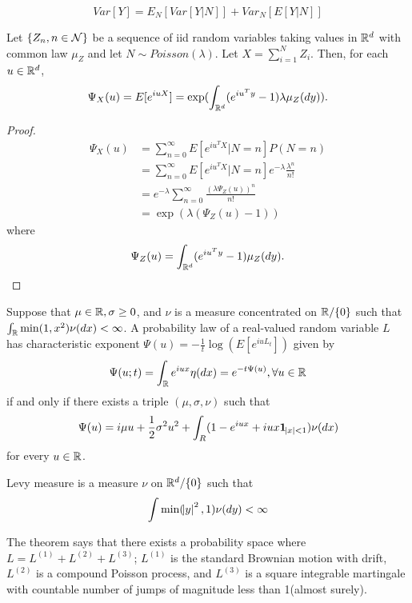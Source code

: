 \begin{refsection}
\begin{lemma}
	$$Var[Y] = E_N[Var[Y|N]] + Var_N[E[Y|N]]$$
\end{lemma}


\begin{lemma}
	Let $\{Z_n,n\in \mathcal{N} \}$ be a sequence of iid random variables taking values in $\mathbb{R}^d$ with common law $\mu_Z$ and let $N\sim Poisson(\lambda)$. Let 
	$X = \sum_{i=1}^N Z_i.$ 
	Then, for each $u\in \mathbb{R}^d$, 
	$$\Psi_X(u) = E[e^{iuX}] = \exp(\int_{\mathbb{R}^d} (e^{iu^Ty}-1)\lambda \mu_Z(dy)).$$
\end{lemma}
\begin{proof}
	\begin{align*}
	\Psi_X(u) &= \sum_{n=0}^\infty E[e^{iu^TX}|N=n]P(N=n)\\
	&=\sum_{n=0}^\infty E[e^{iu^TX}|N=n]e^{-\lambda} \frac{\lambda^n}{n!}\\
	&=e^{-\lambda}\sum_{n=0}^\infty \frac{(\lambda\Psi_Z(u))^n}{n!}\\
	&=\exp(\lambda(\Psi_Z(u)-1))
	\end{align*}
	where
	$$\Psi_Z(u) = \int_{\mathbb{R}^d} (e^{iu^Ty}-1) \mu_Z(dy).$$
\end{proof}



\begin{theorem}
	Suppose that $\mu\in \mathbb{R}, \sigma \geq 0$, and $\nu$ is a measure concentrated on $\mathbb{R}/\{0\}$ such that $\int_{\mathbb{R}}\min(1,x^2)\nu(dx) < \infty$. A probability law of a real-valued random variable $L$ has characteristic exponent $\Psi(u) = -\frac{1}{t}\log(E[e^{iuL_t}])$ given by
	$$\Psi(u;t) = \int_{\mathbb{R}} e^{iux}\eta(dx) = e^{-t\Psi(u)},\forall u\in \mathbb{R}$$
	if and only if there exists a triple $(\mu,\sigma,\nu)$ such that
	$$\Psi(u) = i\mu u + \frac{1}{2}\sigma^2 u^2 + \int_R (1-e^{iux} + iux \bm{1}_{\abs{x}<1}) \nu(dx)$$
	for every $u\in\mathbb{R}$.
\end{theorem}

\begin{definition}
	Levy measure is a measure $\nu$ on $\mathbb{R}^d/\{0\}$ such that
	$$\int\min(\abs{y}^2,1)\nu(dy) < \infty$$
\end{definition}


\begin{remark}[interpretation]\cite{Manuge2015levy}
	The theorem says that there exists a probability space where $L = L^{(1)}+L^{(2)}+L^{(3)}$; $L^{(1)}$ is the standard Brownian motion with drift, $L^{(2)}$ is a compound Poisson process, and $L^{(3)}$ is a square integrable martingale with countable number of jumps of magnitude less than 1(almost surely).
\end{remark}



\end{refsection}
